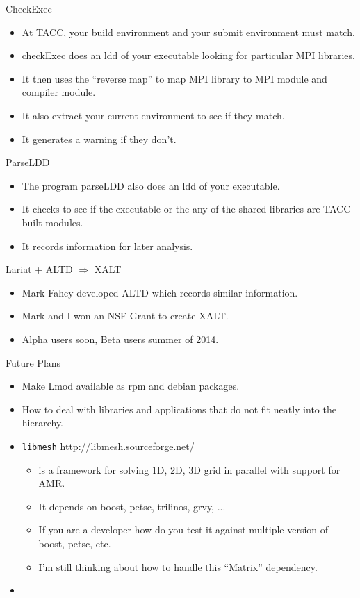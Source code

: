 \documentclass{beamer}
\begin{document}
\begin{frame}{CheckExec}
  \begin{itemize}
    \item At TACC, your build environment and your submit environment
      must match.
    \item checkExec does an ldd of your executable looking for particular MPI libraries.
    \item It then uses the ``reverse map'' to map MPI library to MPI
      module and compiler module.
    \item It also extract your current environment to see if they match.
    \item It generates a warning if they don't.
  \end{itemize}
\end{frame}

\begin{frame}{ParseLDD}
  \begin{itemize}
    \item The program parseLDD also does an ldd of your executable.
    \item It checks to see if the executable or the any of the shared
      libraries are TACC built modules.
    \item It records information for later analysis.
  \end{itemize}
\end{frame}

\begin{frame}{Lariat + ALTD $\Rightarrow$ XALT}
  \begin{itemize}
    \item Mark Fahey developed ALTD which records similar information.
    \item Mark and I won an NSF Grant to create XALT.
    \item Alpha users soon, Beta users summer of 2014.
  \end{itemize}
\end{frame}
\begin{frame}{Future Plans}
  \begin{itemize}
    \item Make Lmod available as rpm and debian packages.
    \item How to deal with libraries and applications that do not fit
      neatly into the hierarchy.
    \item \texttt{libmesh} http://libmesh.sourceforge.net/
      \begin{itemize}
        \item is a framework for solving 1D, 2D, 3D grid
          in parallel with support for AMR.
        \item It depends on boost, petsc, trilinos, grvy, ...
        \item If you are a developer how do you test it against
          multiple version of boost, petsc, etc.
        \item I'm still thinking about how to handle this ``Matrix'' dependency.
      \end{itemize}
    \item
  \end{itemize}
\end{frame}
\end{document}
